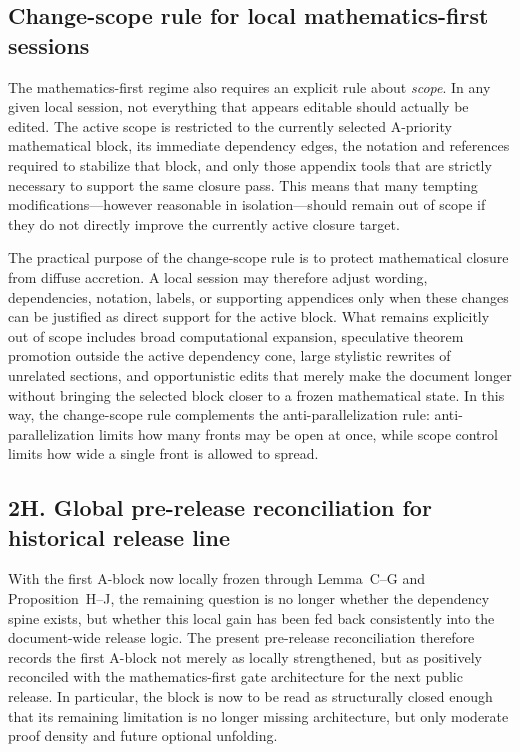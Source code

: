 \documentclass[12pt,a4paper]{article}
\DeclareRobustCommand{\QSCver}[1]{archival stage}
\renewcommand{\QSCver}[1]{historical release line}
\begin{document}
\subsection*{Change-scope rule for local mathematics-first sessions}
The mathematics-first regime also requires an explicit rule about \emph{scope}. In any given local session, not everything that appears editable should actually be edited. The active scope is restricted to the currently selected A-priority mathematical block, its immediate dependency edges, the notation and references required to stabilize that block, and only those appendix tools that are strictly necessary to support the same closure pass. This means that many tempting modifications---however reasonable in isolation---should remain out of scope if they do not directly improve the currently active closure target.

The practical purpose of the change-scope rule is to protect mathematical closure from diffuse accretion. A local session may therefore adjust wording, dependencies, notation, labels, or supporting appendices only when these changes can be justified as direct support for the active block. What remains explicitly out of scope includes broad computational expansion, speculative theorem promotion outside the active dependency cone, large stylistic rewrites of unrelated sections, and opportunistic edits that merely make the document longer without bringing the selected block closer to a frozen mathematical state. In this way, the change-scope rule complements the anti-parallelization rule: anti-parallelization limits how many fronts may be open at once, while scope control limits how wide a single front is allowed to spread.





\subsection*{2H. Global pre-release reconciliation for \QSCver{v2.27.0}}
With the first A-block now locally frozen through Lemma~C--G and Proposition~H--J, the remaining question is no longer whether the dependency spine exists, but whether this local gain has been fed back consistently into the document-wide release logic. The present pre-release reconciliation therefore records the first A-block not merely as locally strengthened, but as positively reconciled with the mathematics-first gate architecture for the next public release. In particular, the block is now to be read as structurally closed enough that its remaining limitation is no longer missing architecture, but only moderate proof density and future optional unfolding.
\end{document}
